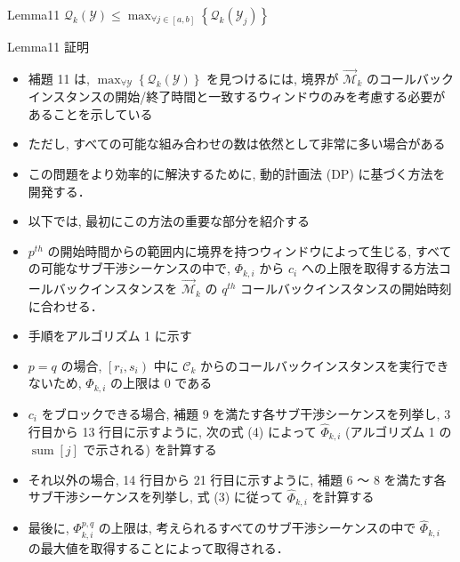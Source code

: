 \begin{frame}{Lemma11}
    $\mathcal{Q}_{k}(\mathcal{Y}) \leq \max _{\forall j \in[a, b]}\left\{\mathcal{Q}_{k}\left(\mathcal{Y}_{j}\right)\right\}$
\end{frame}

\begin{frame}{Lemma11 証明}
    \todo{}
\end{frame}

\begin{frame}{}
    \begin{itemize}
        \item 補題 11 は, $\max _{\forall \mathcal{Y}}\left\{\mathcal{Q}_{k}(\mathcal{Y})\right\}$ を見つけるには, 境界が $\overrightarrow{\mathcal{M}}_{k}$ のコールバックインスタンスの開始/終了時間と一致するウィンドウのみを考慮する必要があることを示している
        \item ただし, すべての可能な組み合わせの数は依然として非常に多い場合がある
        \item この問題をより効率的に解決するために, 動的計画法 (DP) に基づく方法を開発する．
    \end{itemize}
\end{frame}

\begin{frame}{}
    \begin{itemize}
        \item 以下では, 最初にこの方法の重要な部分を紹介する
        \item $p^{t h}$ の開始時間からの範囲内に境界を持つウィンドウによって生じる, すべての可能なサブ干渉シーケンスの中で, $\Phi_{k, i}$ から $c_{i}$ への上限を取得する方法コールバックインスタンスを $\overrightarrow{\mathcal{M}}_{k}$ の $q^{t h}$ コールバックインスタンスの開始時刻に合わせる．
    \end{itemize}
\end{frame}

\begin{frame}{}
    \begin{itemize}
        \item 手順をアルゴリズム 1 に示す
        \item $p=q$ の場合, $\left[r_{i}, s_{i}\right)$ 中に $\mathcal{C}_{k}$ からのコールバックインスタンスを実行できないため, $\Phi_{k, i}$ の上限は 0 である
        \item $c_{i}$ をブロックできる場合, 補題 9 を満たす各サブ干渉シーケンスを列挙し, 3 行目から 13 行目に示すように, 次の式 (4) によって $\hat{\Phi}_{k, i}$ (アルゴリズム 1 の $\operatorname{sum}[j]$ で示される) を計算する
        \item それ以外の場合, 14 行目から 21 行目に示すように, 補題 6 ～ 8 を満たす各サブ干渉シーケンスを列挙し, 式 (3) に従って $\hat{\Phi}_{k, i}$ を計算する
        \item 最後に, $\Phi_{k, i}^{p, q}$ の上限は, 考えられるすべてのサブ干渉シーケンスの中で $\hat{\Phi}_{k, i}$ の最大値を取得することによって取得される．
    \end{itemize}
\end{frame}


